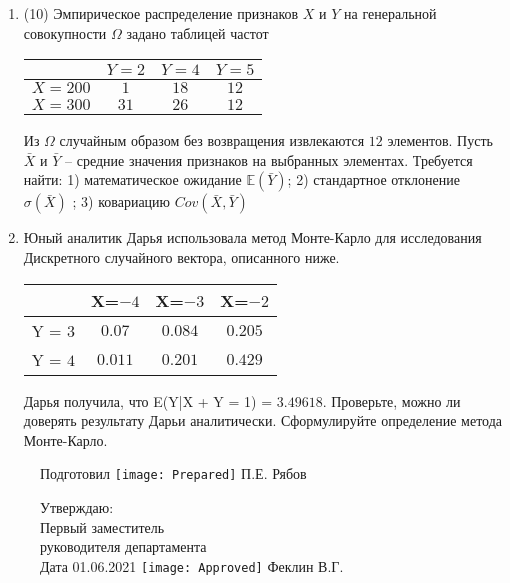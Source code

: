 \documentclass[a4paper,10pt]{article}
\begin{document}
\begin{enumerate}
\item


(10) Эмпирическое распределение признаков $X$ и $Y$ на генеральной совокупности $\Omega$ задано таблицей частот  
 
\begin{tabular}{ | c | c | c | c | }
\hline
 & $Y = 2$ & $Y = 4$ & $Y = 5$  \\ \hline
$X = 200$ & $1$ & $18$ & $12$\\ \hline
$X = 300$ & $31$ & $26$ & $12$\\
\hline
\end{tabular}

Из $\Omega$ случайным образом без возвращения извлекаются $12$ элементов. 
Пусть $\bar X$ и $\bar Y$ – средние значения признаков на выбранных элементах. 
Требуется найти: 1) математическое ожидание $\mathbb{E}(\bar Y)$; 2) стандартное отклонение $\sigma(\bar X)$ ; 
3) ковариацию $Cov(\bar X, \bar Y)$


\item

    
    	Юный аналитик Дарья использовала метод Монте-Карло для исследования Дискретного случайного вектора, описанного ниже.

        \begin{tabular}{|c|c|c|c|}
	\hline
	& X=$-4$ & X=$-3$ & X=$-2$ \\
	\hline
	Y = $3$ & $0.07$ & $0.084$  &  $0.205$ \\
	\hline
	Y = $4$ & $0.011$ & $0.201$ & $0.429$  \\
	\hline
\end{tabular}

    	Дарья получила, что E(Y|X + Y = 1) = $3.49618$.
    	Проверьте, можно ли доверять результату Дарьи аналитически. Сформулируйте определение метода Монте-Карло.
    

\end{enumerate}

\begin{figure}[H]
	Подготовил
	\hfill
	\texttt{[image: Prepared]}
	П.Е. Рябов
\end{figure}


\begin{figure}[H]
	Утверждаю:\\
	Первый заместитель\\
	руководителя департамента\\
	Дата 01.06.2021
	\hfill
	\texttt{[image: Approved]}
	Феклин В.Г.
\end{figure}
\end{document}
